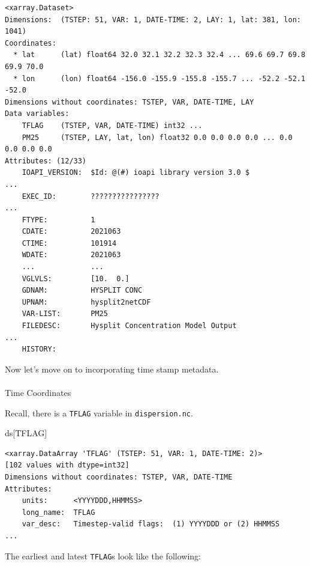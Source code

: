 \documentclass[
  letterpaper,
  DIV=11,
  numbers=noendperiod]{scrreprt}
\makeatletter
\let\oldparagraph\paragraph
\renewcommand{\paragraph}{
    \@ifstar
      \xxxParagraphStar
      \xxxParagraphNoStar
  }
\newcommand{\xxxParagraphStar}[1]{\oldparagraph*{#1}\mbox{}}
\newcommand{\xxxParagraphNoStar}[1]{\oldparagraph{#1}\mbox{}}
\newenvironment{Shaded}{\begin{snugshade}}{\end{snugshade}}
\newcommand{\NormalTok}[1]{\textcolor[rgb]{0.00,0.23,0.31}{#1}}
\newcommand{\StringTok}[1]{\textcolor[rgb]{0.13,0.47,0.30}{#1}}
\makeatother
\begin{document}
\begin{verbatim}
<xarray.Dataset>
Dimensions:  (TSTEP: 51, VAR: 1, DATE-TIME: 2, LAY: 1, lat: 381, lon: 1041)
Coordinates:
  * lat      (lat) float64 32.0 32.1 32.2 32.3 32.4 ... 69.6 69.7 69.8 69.9 70.0
  * lon      (lon) float64 -156.0 -155.9 -155.8 -155.7 ... -52.2 -52.1 -52.0
Dimensions without coordinates: TSTEP, VAR, DATE-TIME, LAY
Data variables:
    TFLAG    (TSTEP, VAR, DATE-TIME) int32 ...
    PM25     (TSTEP, LAY, lat, lon) float32 0.0 0.0 0.0 0.0 ... 0.0 0.0 0.0 0.0
Attributes: (12/33)
    IOAPI_VERSION:  $Id: @(#) ioapi library version 3.0 $                    ...
    EXEC_ID:        ????????????????                                         ...
    FTYPE:          1
    CDATE:          2021063
    CTIME:          101914
    WDATE:          2021063
    ...             ...
    VGLVLS:         [10.  0.]
    GDNAM:          HYSPLIT CONC    
    UPNAM:          hysplit2netCDF  
    VAR-LIST:       PM25            
    FILEDESC:       Hysplit Concentration Model Output                       ...
    HISTORY:        
\end{verbatim}

Now let's move on to incorporating time stamp metadata.

\paragraph{Time Coordinates}\label{time-coordinates}

Recall, there is a \texttt{TFLAG} variable in \texttt{dispersion.nc}.

\begin{Shaded}
\begin{Highlighting}[]
\NormalTok{ds[}\StringTok{\textquotesingle{}TFLAG\textquotesingle{}}\NormalTok{]}
\end{Highlighting}
\end{Shaded}

\begin{verbatim}
<xarray.DataArray 'TFLAG' (TSTEP: 51, VAR: 1, DATE-TIME: 2)>
[102 values with dtype=int32]
Dimensions without coordinates: TSTEP, VAR, DATE-TIME
Attributes:
    units:      <YYYYDDD,HHMMSS>
    long_name:  TFLAG           
    var_desc:   Timestep-valid flags:  (1) YYYYDDD or (2) HHMMSS             ...
\end{verbatim}

The earliest and latest \texttt{TFLAG}s look like the following:
\end{document}
